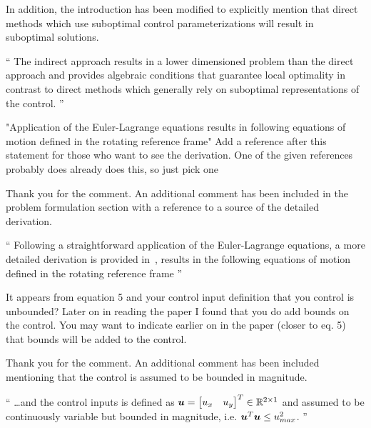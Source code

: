 \documentclass[11pt]{article}
\newenvironment{correction}{\begin{list}{}{\setlength{\leftmargin}{1cm}\setlength{\rightmargin}{1cm}}\vspace{\parsep}\item[]``}{''\end{list}}
\begin{document}
\begin{enumerate}
In addition, the introduction has been modified to explicitly mention that direct methods which use suboptimal control parameterizations will result in suboptimal solutions.

\begin{correction}
The indirect approach results in a lower dimensioned problem than the direct approach and provides algebraic conditions that guarantee local optimality in contrast to direct methods which generally rely on suboptimal representations of the control.
\end{correction}

\item 
    \begin{itshape}
"Application of the Euler-Lagrange equations results in following equations of motion defined in the rotating reference frame"  Add a reference after this statement for those who want to see the derivation.  One of the given references probably does already does this, so just pick one
\end{itshape}

Thank you for the comment.
An additional comment has been included in the problem formulation section with a reference to a source of the detailed derivation.
\begin{correction}
Following a straightforward application of the Euler-Lagrange equations, a more detailed derivation is provided in~\cite{szebehely1967}, results in the following equations of motion defined in the rotating reference frame
\end{correction}

\item 
    \begin{itshape}
It appears from equation 5 and your control input definition that you control is unbounded?  Later on in reading the paper I found that you do add bounds on the control.  You may want to indicate earlier on in the paper (closer to eq. 5) that bounds will be added to the control.
\end{itshape}

Thank you for the comment.
An additional comment has been included mentioning that the control is assumed to be bounded in magnitude.

\begin{correction}
\ldots and the control inputs is defined as \( \bm{u} = \begin{bmatrix} u_x & u_y \end{bmatrix}^T \in \mathbb{R}^{2\times1} \) and assumed to be continuously variable but bounded in magnitude, i.e. \( \bm{u}^T \bm{u} \leq u_{max}^2 \).
\end{correction}


\end{enumerate}
\end{document}
